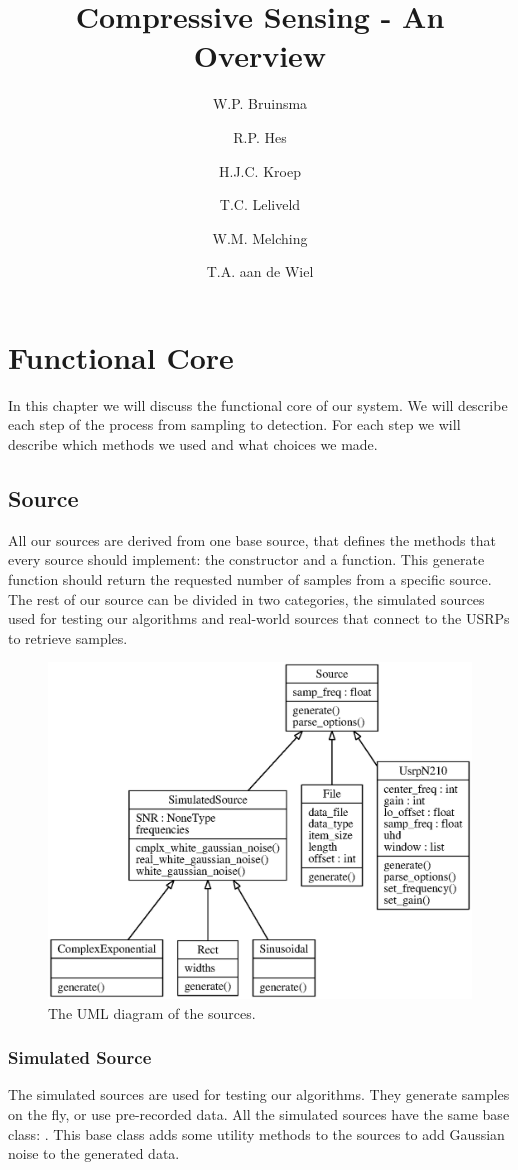 \documentclass[a4paper, openany, oneside]{memoir}
\title{Compressive Sensing - An Overview}
\author{W.P. Bruinsma \and R.P. Hes \and H.J.C. Kroep \and T.C. Leliveld \and W.M. Melching \and T.A. aan de Wiel}
\begin{document}
\chapter{Functional Core}
\label{cha:model}
In this chapter we will discuss the functional core of our system. We will describe each step of the process from sampling to detection. For each step we will describe which methods we used and what choices we made.

\section{Source}
\label{sec:source}
All our sources are derived from one base source, that defines the methods that every source should implement: the constructor and a  function. This generate function should return the requested number of samples from a specific source. The rest of our source can be divided in two categories, the simulated sources used for testing our algorithms and real-world sources that connect to the USRPs to retrieve samples.

\begin{figure}
    \centering
    \includegraphics[width=\linewidth]{./figures/classes_source.eps}
    \caption{The UML diagram of the sources.}
    \label{fig:umlsource}
\end{figure}

\subsection{Simulated Source}
\label{sec:simulated-source}
The simulated sources are used for testing our algorithms. They generate samples on the fly, or use pre-recorded data. All the simulated sources have the same base class: . This base class adds some utility methods to the sources to add Gaussian noise to the generated data.
\end{document}
